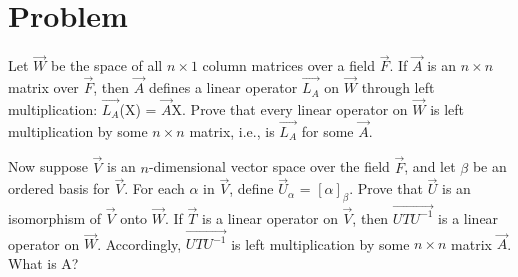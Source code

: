 \documentclass[journal,12pt,twocolumn]{IEEEtran}
\begin{document}
\section{Problem}
Let $\vec{W}$ be the space of all $n \times 1$ column matrices over a field $\vec{F}$. If $\vec{A}$ is an $n \times n$ matrix over $\vec{F}$, then $\vec{A}$ defines a linear operator $\vec{L_{A}}$ on $\vec{W}$ through left multiplication: $\vec{L_{A}}$(X) = $\vec{A}$X. Prove that every linear operator on $\vec{W}$ is left multiplication by some $n\times n$ matrix, i.e., is $\vec{L_{A}}$ for some $\vec{A}$.

Now suppose $\vec{V}$ is an $n$-dimensional vector space over the field $\vec{F}$, and let $\beta$ be an ordered basis for $\vec{V}$. For each $\alpha$ in $\vec{V}$, define $\vec{U}_{\alpha}$ = $[\alpha]_{\beta}$. Prove that $\vec{U}$ is an isomorphism of $\vec{V}$ onto $\vec{W}$. If $\vec{T}$ is a linear operator on $\vec{V}$, then $\vec{UTU^{-1}}$ is a linear operator on $\vec{W}$. Accordingly, $\vec{UTU^{-1}}$ is left multiplication by some $n \times n$ matrix $\vec{A}$.
What is A?
\end{document}
